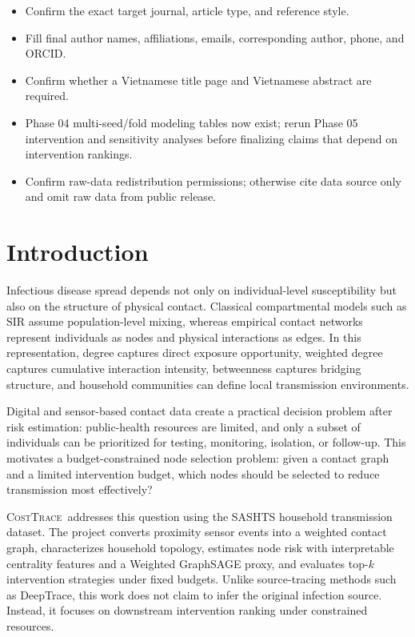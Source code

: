 \documentclass[11pt,a4paper]{article}
\newcommand{\costtrace}{\textsc{CostTrace}}
\begin{document}
\begin{itemize}
  \item Confirm the exact target journal, article type, and reference style.
  \item Fill final author names, affiliations, emails, corresponding author, phone, and ORCID.
  \item Confirm whether a Vietnamese title page and Vietnamese abstract are required.
  \item Phase 04 multi-seed/fold modeling tables now exist; rerun Phase 05 intervention and sensitivity analyses before finalizing claims that depend on intervention rankings.
  \item Confirm raw-data redistribution permissions; otherwise cite data source only and omit raw data from public release.
\end{itemize}

\section{Introduction}

Infectious disease spread depends not only on individual-level susceptibility but also on the structure of physical contact. Classical compartmental models such as SIR assume population-level mixing, whereas empirical contact networks represent individuals as nodes and physical interactions as edges. In this representation, degree captures direct exposure opportunity, weighted degree captures cumulative interaction intensity, betweenness captures bridging structure, and household communities can define local transmission environments.

Digital and sensor-based contact data create a practical decision problem after risk estimation: public-health resources are limited, and only a subset of individuals can be prioritized for testing, monitoring, isolation, or follow-up. This motivates a budget-constrained node selection problem: given a contact graph and a limited intervention budget, which nodes should be selected to reduce transmission most effectively?

\costtrace\ addresses this question using the SASHTS household transmission dataset. The project converts proximity sensor events into a weighted contact graph, characterizes household topology, estimates node risk with interpretable centrality features and a Weighted GraphSAGE proxy, and evaluates top-\(k\) intervention strategies under fixed budgets. Unlike source-tracing methods such as DeepTrace, this work does not claim to infer the original infection source. Instead, it focuses on downstream intervention ranking under constrained resources.
\end{document}
